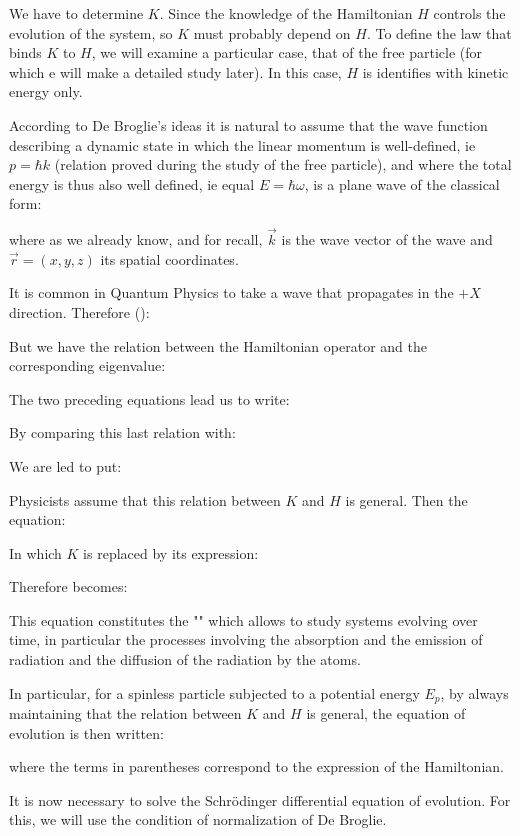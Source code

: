 	We have to determine $K$. Since the knowledge of the Hamiltonian $H$ controls the evolution of the system, so $K$ must probably depend on $H$. To define the law that binds $K$ to $H$, we will examine a particular case, that of the free particle (for which e will make a detailed study later). In this case, $H$ is identifies with kinetic energy only.
	
	According to De Broglie's ideas it is natural to assume that the wave function describing a dynamic state in which the linear momentum is well-defined, ie $p=\hbar k$ (relation proved during the study of the free particle), and where the total energy is thus also well defined, ie equal $E=\hbar\omega$, is a plane wave of the classical form:
	
	where as we already know, and for recall, $\vec{k}$ is the wave vector of the wave and $\vec{r}=(x,y,z)$ its spatial coordinates.
	
	It is common in Quantum Physics to take a wave that propagates in the $+X$ direction. Therefore ():
	
	But we have the relation between the Hamiltonian operator and the corresponding eigenvalue:
	
	The two preceding equations lead us to write:
	
	By comparing this last relation with:
	
	We are led to put:
	
	Physicists assume that this relation between $K$ and $H$ is general. Then the equation:
	
	In which $K$ is replaced by its expression:
	
	Therefore becomes:
	
	This equation constitutes the "" which allows to study systems evolving over time, in particular the processes involving the absorption and the emission of radiation and the diffusion of the radiation by the atoms.
	
	In particular, for a spinless particle subjected to a potential energy $E_p$, by always maintaining that the relation between $K$ and $H$ is general, the equation of evolution is then written:
	
	where the terms in parentheses correspond to the expression of the Hamiltonian.

	It is now necessary to solve the Schrödinger differential equation of evolution. For this, we will use the condition of normalization of De Broglie.

